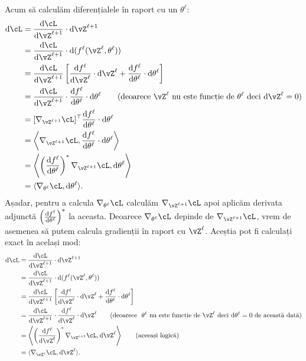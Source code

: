 \documentclass[../../book-main_ro.tex]{subfiles}
\begin{document}
Acum să calculăm diferențialele în raport cu un \(\theta^{\ell}\):
\begin{align}
    \odif{\cL}
    &= \odv{\cL}{\vZ^{\ell + 1}}\cdot \odif{\vZ^{\ell + 1}} \\ 
    &= \odv{\cL}{\vZ^{\ell + 1}}\cdot \odif{{(f^{\ell}(\vZ^{\ell}, \theta^{\ell}))}} \\
    &= \odv{\cL}{\vZ^{\ell + 1}}\bs{\odv{f^{\ell}}{\vZ^{\ell}}\cdot\odif{\vZ}^{\ell} + \odv{f^{\ell}}{\theta^{\ell}}\cdot\odif{\theta}^{\ell}} \\
    &= \odv{\cL}{\vZ^{\ell + 1}}\cdot \odv{f^{\ell}}{\theta^{\ell}}\cdot\odif{\theta}^{\ell} \qquad \text{(deoarece~\(\vZ^{\ell}\) nu este funcție de \(\theta^{\ell}\) deci \(\odif{\vZ}^{\ell} = 0\))} \\
    &= [\nabla_{\vZ^{\ell + 1}}\cL]^{\top}\odv{f^{\ell}}{\theta^{\ell}}\cdot\odif{\theta}^{\ell} \\ 
    &= \ip*{\nabla_{\vZ^{\ell + 1}}\cL}{\odv{f^{\ell}}{\theta^{\ell}}\cdot\odif{\theta}^{\ell}} \\
    &= \ip*{\bp{\odv{f^{\ell}}{\theta^{\ell}}}^{*}\nabla_{\vZ^{\ell + 1}}\cL}{\odif{\theta}^{\ell}} \\ 
    &= \ip{\nabla_{\theta^{\ell}}\cL}{\odif{\theta}^{\ell}}.
\end{align}
Așadar, pentru a calcula \(\nabla_{\theta^{\ell}}\cL\) calculăm \(\nabla_{\vZ^{\ell + 1}}\cL\) apoi aplicăm derivata adjunctă \(\bp{\odv{f^{\ell}}{\theta^{\ell}}}^{*}\) la aceasta. Deoarece \(\nabla_{\theta^{\ell}}\cL\) depinde de \(\nabla_{\vZ^{\ell + 1}}\cL\), vrem de asemenea să putem calcula gradienții în raport cu \(\vZ^{\ell}\). Aceștia pot fi calculați exact în același mod:
\begin{align}
    \odif{\cL}
    &= \odv{\cL}{\vZ^{\ell + 1}}\cdot \odif{\vZ^{\ell + 1}} \\ 
    &= \odv{\cL}{\vZ^{\ell + 1}}\cdot\odif{{(f^{\ell}(\vZ^{\ell}, \theta^{\ell}))}} \\
    &= \odv{\cL}{\vZ^{\ell + 1}}\bs{\odv{f^{\ell}}{\vZ^{\ell}}\cdot\odif{\vZ}^{\ell} + \odv{f^{\ell}}{\theta^{\ell}}\cdot\odif{\theta}^{\ell}} \\
    &= \odv{\cL}{\vZ^{\ell + 1}}\cdot\odv{f^{\ell}}{\vZ^{\ell}}\cdot\odif{\vZ}^{\ell} \qquad \text{(deoarece~~\(\theta^{\ell}\) nu este funcție de \(\vZ^{\ell}\) deci \(\odif{\theta}^{\ell} = 0\) de această dată)} \\ 
    &= \ip*{\bp{\odv{f^{\ell}}{\vZ^{\ell}}}^{*}\nabla_{\vZ^{\ell + 1}}\cL}{\odif{\vZ}^{\ell}} \qquad \text{(aceeași logică)} \\ 
    &= \ip{\nabla_{\vZ^{\ell}}\cL}{\odif{\vZ}^{\ell}}.
\end{align}
\end{document}
